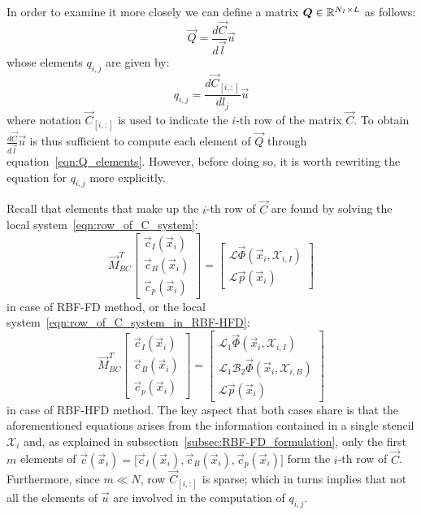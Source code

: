 \medskip
In order to examine it more closely we can define a matrix $\boldsymbol{Q} \in \mathbb{R}^{N_I \times L}$ as follows:
\begin{equation}
	\vec{Q} = \frac{d\vec{C}}{d\vec{l}} \vec{u}
\end{equation}
whose elements $q_{i,j}$ are given by:
\begin{equation}
	\label{eqn:Q_elements}
	q_{i,j} = \frac{d\vec{C}_{[i,:]}}{dl_j} \vec{u}
\end{equation}
where notation $\vec{C}_{[i,:]}$ is used to indicate the $i$-th row of the matrix $\vec{C}$.
To obtain $\frac{d\vec{C}}{d\vec{l}} \vec{u}$ is thus sufficient to compute each element of $\vec{Q}$ through equation~\eqref{eqn:Q_elements}. However, before doing so, it is worth rewriting the equation for $q_{i,j}$ more explicitly.

Recall that elements that make up the $i$-th row of $\vec{C}$ are found by solving the local system~\eqref{eqn:row_of_C_system}:
\begin{equation}
	\vec{M}_{BC}^T
	\begin{bmatrix}
		\vec{c}_I(\vec{x}_i)  \\
		\vec{c}_B(\vec{x}_i)  \\
		\vec{c}_p(\vec{x}_i)
	\end{bmatrix} = 
	\begin{bmatrix}
		\mathcal{L} \vec{\Phi}(\vec{x}_i, \mathcal{X}_{i,I})  \\
		\mathcal{L} \vec{p}(\vec{x}_i)
	\end{bmatrix}
\end{equation}
in case of RBF-FD method, or the local system~\eqref{eqn:row_of_C_system_in_RBF-HFD}:
\begin{equation}
	\label{eqn:adjoint_method_row_of_C_system_in_RBF-HFD}
	\vec{M}_{BC}^T
	\begin{bmatrix}
		\vec{c}_I(\vec{x}_i)  \\
		\vec{c}_B(\vec{x}_i)  \\
		\vec{c}_p(\vec{x}_i)
	\end{bmatrix} = 
	\begin{bmatrix}
		\mathcal{L}_1 \vec{\Phi}(\vec{x}_i, \mathcal{X}_{i,I})  			  \\
		\mathcal{L}_1 \mathcal{B}_2 \vec{\Phi}(\vec{x}_i, \mathcal{X}_{i,B})  \\
		\mathcal{L} \vec{p}(\vec{x}_i)
	\end{bmatrix}
\end{equation}
in case of RBF-HFD method. The key aspect that both cases share is that the aforementioned equations arises from the information contained in a single stencil $\mathcal{X}_i$ and, as explained in subsection~\ref{subsec:RBF-FD_formulation}, only the first $m$ elements of $\vec{c}(\vec{x}_i) = \bigl[ \vec{c}_I(\vec{x}_i), \vec{c}_B(\vec{x}_i), \vec{c}_p(\vec{x}_i) \bigr]$ form the $i$-th row of $\vec{C}$. 
Furthermore, since $m \ll N$, row $\vec{C}_{[i,:]}$ is sparse; which in turns implies that not all the elements of $\vec{u}$ are involved in the computation of $q_{i,j}$.


